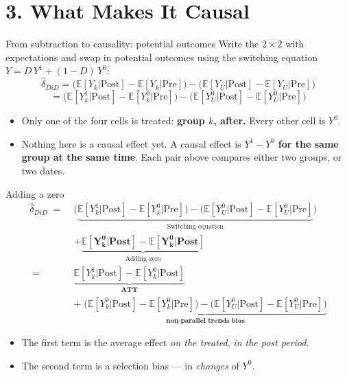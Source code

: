 \documentclass[
  11pt,
  ignorenonframetext,
  aspectratio=169,
]{beamer}
\providecommand{\tightlist}{%
  \setlength{\itemsep}{0pt}\setlength{\parskip}{0pt}}
\begin{document}
\section{3. What Makes It Causal}\label{what-makes-it-causal}

\begin{frame}{From subtraction to causality: potential outcomes}
\protect{}\label{from-subtraction-to-causality-potential-outcomes}
Write the \(2 \times 2\) with expectations and swap in potential
outcomes using the switching equation \(Y = D\,Y^1 + (1-D)\,Y^0\): \[
\hat\delta_{DiD} = \big(\mathbb{E}[Y_k|\text{Post}] - \mathbb{E}[Y_k|\text{Pre}]\big) - \big(\mathbb{E}[Y_U|\text{Post}] - \mathbb{E}[Y_U|\text{Pre}]\big)
\] \[
= \big(\mathbb{E}[Y^{1}_k|\text{Post}] - \mathbb{E}[Y^{0}_k|\text{Pre}]\big) - \big(\mathbb{E}[Y^{0}_U|\text{Post}] - \mathbb{E}[Y^{0}_U|\text{Pre}]\big)
\]

\begin{itemize}
\tightlist
\item
  Only one of the four cells is treated: \textbf{group \(k\), after.}
  Every other cell is \(Y^0\).
\item
  Nothing here is a causal effect yet. A causal effect is \(Y^1 - Y^0\)
  \textbf{for the same group at the same time}. Each pair above compares
  either two groups, or two dates.
\end{itemize}
\end{frame}

\begin{frame}{Adding a zero}
\protect{}\label{adding-a-zero}
\begin{align*}
  \hat{\delta}_{DiD} \;=\;& \big ( \underbrace{\mathbb{E}[Y^1_k|\text{Post}] -
    \mathbb{E}[Y^0_k|\text{Pre}] \big ) - \big ( \mathbb{E}[Y^0_U | \text{Post} ] - \mathbb{E}[ Y^0_U |
  \text{Pre}]}_{\text{Switching equation}} \big) \\
  &+ \underbrace{\mathbf{\mathbb{E}[Y_k^{\textbf{0}} |\text{Post}] -
  \mathbb{E}[Y^{\textbf{0}}_k | \text{Post}]}}_{\text{Adding zero}} \\
\;=\;& \underbrace{\mathbb{E}[Y^1_k|\text{Post}] - \mathbb{E}[Y^0_k|\text{Post}]}_{\textbf{ATT}} \\
&+\; \underbrace{\big(\mathbb{E}[Y^0_k|\text{Post}] - \mathbb{E}[Y^0_k|\text{Pre}]\big) - \big(\mathbb{E}[Y^0_U|\text{Post}] - \mathbb{E}[Y^0_U|\text{Pre}]\big)}_{\textbf{non-parallel trends bias}}
\end{align*}

\begin{itemize}
\tightlist
\item
  The first term is the average effect \emph{on the treated}, \emph{in
  the post period}.
\item
  The second term is a selection bias --- in \emph{changes} of \(Y^0\).
\end{itemize}
\end{frame}
\end{document}
